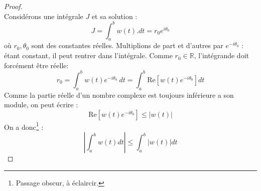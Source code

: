 \begin{proof}\ \\
	Considérons une intégrale $J$ et sa solution :
	\begin{equation}
		J = \int_a^b w(t).dt = r_0e^{i\theta_0}
	\end{equation}
	où $r_0, \theta_0$ sont des constantes réelles. Multiplions de part et d'autres par 
	$e^{-i\theta_0}$ : étant constant, il peut rentrer dans l'intégrale. Comme $r_0 \in
	\mathbb{R}$, l'intégrande doit forcément être réelle:
	\begin{equation}
		r_0 = \int_a^b w(t)e^{-i\theta_0}\ dt = \int_a^b \text{Re}[w(t)e^{-i\theta_0}]dt
	\end{equation}
	Comme la partie réelle d'un nombre complexe est toujours inférieure a son module, 
	on peut écrire :
	\begin{equation}
		\text{Re}[w(t)e^{-i\theta_0}] \leq |w(t)|
	\end{equation}
	On a donc\footnote{Passage obscur, à éclaircir.} :
	\begin{equation}
		\left|\int_a^b w(t) dt\right| \leq \int_a^b |w(t)|dt
	\end{equation}
\end{proof}
